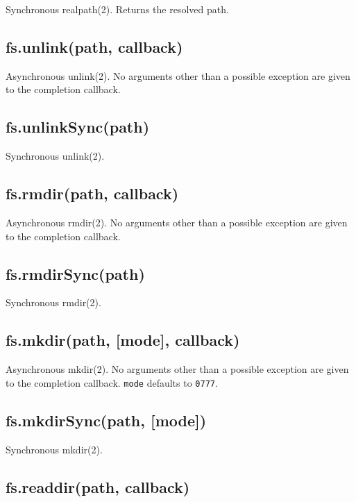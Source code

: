 Synchronous realpath(2). Returns the resolved path.

\subsection{fs.unlink(path, callback)}\label{fs.unlinkpath-callback}

Asynchronous unlink(2). No arguments other than a possible exception are
given to the completion callback.

\subsection{fs.unlinkSync(path)}\label{fs.unlinksyncpath}

Synchronous unlink(2).

\subsection{fs.rmdir(path, callback)}\label{fs.rmdirpath-callback}

Asynchronous rmdir(2). No arguments other than a possible exception are
given to the completion callback.

\subsection{fs.rmdirSync(path)}\label{fs.rmdirsyncpath}

Synchronous rmdir(2).

\subsection{fs.mkdir(path, {[}mode{]},
callback)}\label{fs.mkdirpath-mode-callback}

Asynchronous mkdir(2). No arguments other than a possible exception are
given to the completion callback. \texttt{mode} defaults to
\texttt{0777}.

\subsection{fs.mkdirSync(path, {[}mode{]})}\label{fs.mkdirsyncpath-mode}

Synchronous mkdir(2).

\subsection{fs.readdir(path, callback)}\label{fs.readdirpath-callback}

